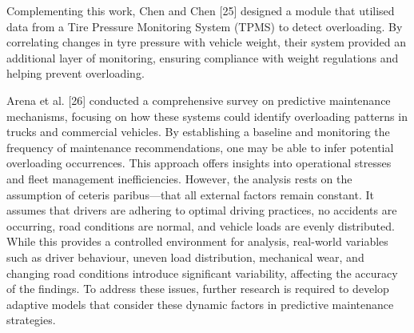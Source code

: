 Complementing this work, Chen and Chen [25] designed a module that utilised data from a Tire Pressure Monitoring System (TPMS) to detect overloading. By correlating changes in tyre pressure with vehicle weight, their system provided an additional layer of monitoring, ensuring compliance with weight regulations and helping prevent overloading.

Arena et al. [26] conducted a comprehensive survey on predictive maintenance mechanisms, focusing on how these systems could identify overloading patterns in trucks and commercial vehicles. By establishing a baseline and monitoring the frequency of maintenance recommendations, one may be able to infer potential overloading occurrences. This approach offers insights into operational stresses and fleet management inefficiencies. However, the analysis rests on the assumption of ceteris paribus—that all external factors remain constant. It assumes that drivers are adhering to optimal driving practices, no accidents are occurring, road conditions are normal, and vehicle loads are evenly distributed. While this provides a controlled environment for analysis, real-world variables such as driver behaviour, uneven load distribution, mechanical wear, and changing road conditions introduce significant variability, affecting the accuracy of the findings. To address these issues, further research is required to develop adaptive models that consider these dynamic factors in predictive maintenance strategies.